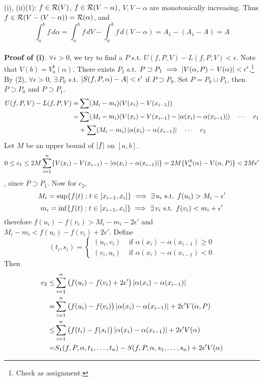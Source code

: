 \\
(i), (ii)\mimp (1): $f\in \mathcal{R}(V)$, $f\in \mathcal{R}(V-\alpha)$, $V, V-\alpha$ are monotonically increasing. Thus $f\in\mathcal{R}(V-(V-\alpha)) =\mathcal{R}(\alpha)$, and $$\int_a^b f\,d\alpha = \int_a^b f\,dV - \int_a^b f\,d(V-\alpha) = A_1-(A_1-A)=A$$
\\
\textbf{Proof of (i)}. $\forall \epsilon > 0$, we try to find a $P$ s.t. $U(f, P, V) - L(f, P, V) < \epsilon$. Note that $V(b) = V_a^b(\alpha)$.
There exists $P_1$ s.t. $P\supset P_1 \implies \left|V(\alpha, P) - V(\alpha)\right| < \epsilon'$.\footnote{Check as assignment.}\\
By (2), $\forall \epsilon > 0$, $\exists \,P_0$ s.t. $\left|S(f, P, \alpha) - A\right| < \epsilon'$ if $P\supset P_0$. Set $P = P_0\cup P_1$, then $P\supset P_0$ and $P\supset P_1$.
$$\begin{aligned}
U(f, P, V) - L(f, P, V) =& \sum (M_i-m_i)(V(x_i)-V(x_{i-1}))\\
=&\sum (M_i-m_i)(V(x_i)-V(x_{i-1}) - \left|\alpha(x_i) - \alpha(x_{i-1})\right|) \quad \cdots \quad c_1\\
&+\sum (M_i-m_i)\left|\alpha(x_i)-\alpha(x_{i-1})\right| \quad \cdots \quad c_2
\end{aligned}$$
Let $M$ be an upper bound of $\left|f\right|$ on $[a, b]$.
$$ 0\leq c_1\leq 2M \sum_{i=1}^n \{ V(x_{i})-V(x_{i-1}) - \left|\alpha(x_i) - \alpha(x_{i-1})\right| \} = 2M \{V_a^b(\alpha) - V(\alpha, P)\} < 2M\epsilon'$$, since $P\supset P_1$. Now for $c_2$,
$$M_i=\sup\{f(t):t\in [x_{i-1}, x_i]\} \implies \exists\,u_i \text{ s.t. } f(u_i) > M_i - \epsilon'$$
$$m_i=\inf\{f(t):t\in [x_{i-1}, x_i]\} \implies \exists\,v_i \text{ s.t. } f(v_i) < m_i + \epsilon'$$
therefore
$f(u_i)-f(v_i) > M_i - m_i - 2\epsilon'$ and $M_i-m_i < f(u_i)-f(v_i) + 2\epsilon'$. Define
$$(t_i, s_i) = \begin{cases}
	(u_i, v_i) & \text{ if }\alpha(x_i) - \alpha(x_{i-1}) \geq 0 \\
	(v_i, u_i) & \text{ if } \alpha(x_i) - \alpha(x_{i-1}) < 0
\end{cases}$$
Then
$$\begin{aligned}
c_2 \leq& \sum_{i=1}^n \big(f(u_i) - f(v_i)+2\epsilon'\big)\left|\alpha(x_i) - \alpha(x_{i-1})\right|\\
=& \sum_{i=1}^n \big(f(u_i) - f(v_i)\big)\left|\alpha(x_i) - \alpha(x_{i-1})\right| + 2\epsilon'V(\alpha, P)\\
\leq& \sum_{i=1}^n \big(f(t_i) - f(s_i)\big)\left|\alpha(x_i) - \alpha(x_{i-1})\right| + 2\epsilon'V(\alpha)\\
=& S_1(f,P, \alpha, t_1, \dots, t_n) - S(f, P, \alpha, s_1, \dots, s_n) + 2\epsilon'V(\alpha)
\end{aligned}$$
